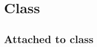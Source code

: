 \section{Class }\label{Labels-class-c}%
\subsection{Attached to class\label{Labels-class-c--L7}}%


